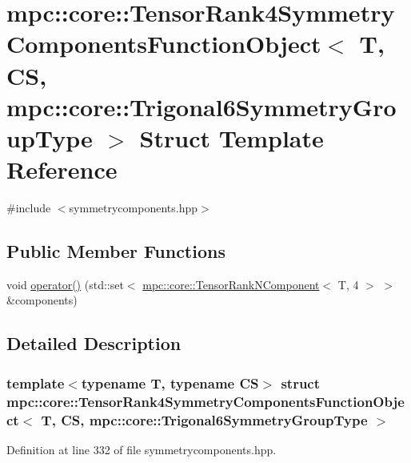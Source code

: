 \hypertarget{structmpc_1_1core_1_1_tensor_rank4_symmetry_components_function_object_3_01_t_00_01_c_s_00_01mpc8f8b6e3c3ae3ae919d47d056c15bff9d}{}\section{mpc\+:\+:core\+:\+:Tensor\+Rank4\+Symmetry\+Components\+Function\+Object$<$ T, CS, mpc\+:\+:core\+:\+:Trigonal6\+Symmetry\+Group\+Type $>$ Struct Template Reference}
\label{structmpc_1_1core_1_1_tensor_rank4_symmetry_components_function_object_3_01_t_00_01_c_s_00_01mpc8f8b6e3c3ae3ae919d47d056c15bff9d}


{\ttfamily \#include $<$symmetrycomponents.\+hpp$>$}

\subsection*{Public Member Functions}
\begin{DoxyCompactItemize}
\item 
void \mbox{\hyperlink{structmpc_1_1core_1_1_tensor_rank4_symmetry_components_function_object_3_01_t_00_01_c_s_00_01mpc8f8b6e3c3ae3ae919d47d056c15bff9d_aebf8dc9617bf12c1d8265727cb7f1f8a}{operator()}} (std\+::set$<$ \mbox{\hyperlink{classmpc_1_1core_1_1_tensor_rank_n_component}{mpc\+::core\+::\+Tensor\+Rank\+N\+Component}}$<$ T, 4 $>$ $>$ \&components)
\end{DoxyCompactItemize}


\subsection{Detailed Description}
\subsubsection*{template$<$typename T, typename CS$>$\newline
struct mpc\+::core\+::\+Tensor\+Rank4\+Symmetry\+Components\+Function\+Object$<$ T, C\+S, mpc\+::core\+::\+Trigonal6\+Symmetry\+Group\+Type $>$}



Definition at line 332 of file symmetrycomponents.\+hpp.



